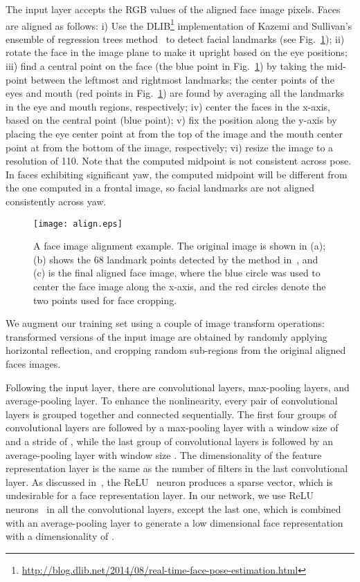 \documentclass[10pt,journal,compsoc]{IEEEtran}
\begin{document}
The input layer accepts the RGB values of the aligned face image pixels. Faces are aligned as follows:
i) Use the  DLIB\footnote{\url{http://blog.dlib.net/2014/08/real-time-face-pose-estimation.html}} implementation of Kazemi and Sullivan's ensemble of regression trees method~\cite{kazemi2014one} to detect  facial landmarks (see Fig.~\ref{fig:alignment});
ii) rotate the face in the image plane to make it upright based on the eye positions;
iii) find a central point on the face (the blue point in Fig.~\ref{fig:alignment}) by taking the mid-point between the leftmost and rightmost landmarks; the center points of the eyes and mouth (red points in Fig.~\ref{fig:alignment}) are found by averaging all the landmarks in the eye and mouth regions, respectively;
iv) center the faces in the x-axis, based on the central point (blue point);
v) fix the position along the y-axis by placing the eye center point at  from the top of the image and the mouth center point at  from the bottom of the image, respectively;
vi) resize the image to a resolution of 110. Note that the computed midpoint is not consistent across pose. In faces exhibiting significant yaw, the computed midpoint will be different from the one computed in a frontal image, so facial landmarks are not aligned consistently across yaw.

\begin{figure}[htbp]
  \centering
  \texttt{[image: align.eps]} \\
  \caption{A face image alignment example. The original image is shown in (a); (b) shows the 68 landmark points detected by the method in~\cite{kazemi2014one}, and (c) is the final aligned face image, where the blue circle was used to center the face image along the x-axis, and the red circles denote the two points used for face cropping.}\label{fig:alignment}
\end{figure}

We augment our training set using a couple of image transform operations: transformed versions of the input image are obtained by randomly applying horizontal reflection, and cropping random  sub-regions from the original  aligned faces images.

Following the input layer, there are  convolutional layers,  max-pooling layers, and  average-pooling layer. To enhance the nonlinearity, every pair of convolutional layers is grouped together and connected sequentially. The first four groups of convolutional layers are followed by a max-pooling layer with a window size of  and a stride of , while the last group of convolutional layers is followed by an average-pooling layer with window size . The dimensionality of the feature representation layer is the same as the number of filters in the last convolutional layer. As discussed in~\cite{DB:CASIA}, the ReLU~\cite{dl:alex2012} neuron produces a sparse vector, which is undesirable for a face representation layer. In our network, we use ReLU neurons~\cite{dl:alex2012} in all the convolutional layers, except the last one, which is combined with an average-pooling layer to generate a low dimensional face representation with a dimensionality of .
\end{document}
